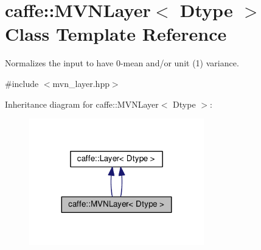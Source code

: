 \hypertarget{classcaffe_1_1_m_v_n_layer}{}\section{caffe\+:\+:M\+V\+N\+Layer$<$ Dtype $>$ Class Template Reference}
\label{classcaffe_1_1_m_v_n_layer}


Normalizes the input to have 0-\/mean and/or unit (1) variance.  




{\ttfamily \#include $<$mvn\+\_\+layer.\+hpp$>$}



Inheritance diagram for caffe\+:\+:M\+V\+N\+Layer$<$ Dtype $>$\+:
\nopagebreak
\begin{figure}[H]
\begin{center}
\leavevmode
\includegraphics[width=215pt]{classcaffe_1_1_m_v_n_layer__inherit__graph}
\end{center}
\end{figure}
